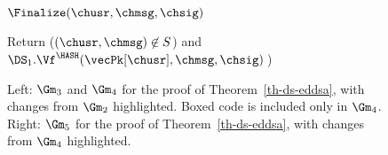 \begin{figure}
{		\begin{oracle}{$\Finalize(\chusr, \chmsg, \chsig)$}
			\item Return ($(\chusr,\chmsg) \not\in S$) and $\DS_1.\Vf^{\HASH}(\vecPk[\chusr], \chmsg, \chsig)\:$) \vspace{2pt}
		\end{oracle}
	}
	\vspace{-5pt}
	\caption{Left: $\Gm_3$ and $\Gm_4$ for the proof of Theorem~\ref{th-ds-eddsa}, with changes from $\Gm_2$ highlighted. Boxed code is included only in $\Gm_4$. Right: $\Gm_5$ for the proof of Theorem~\ref{th-ds-eddsa}, with changes from $\Gm_4$ highlighted.}
	\label{fig:gm345}
	\hrulefill
	\vspace{-10pt}
\end{figure}